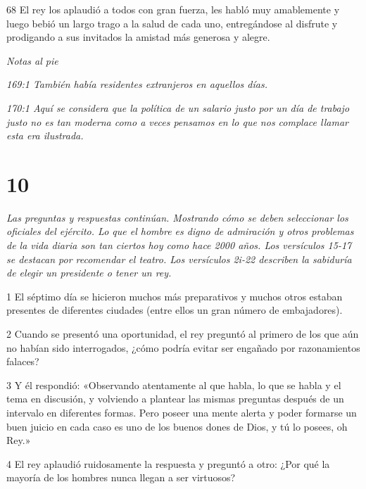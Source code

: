 \par 68 El rey los aplaudió a todos con gran fuerza, les habló muy amablemente y luego bebió un largo trago a la salud de cada uno, entregándose al disfrute y prodigando a sus invitados la amistad más generosa y alegre.

\par \textit{Notas al pie}

\par \textit{169:1 También había residentes extranjeros en aquellos días.}

\par \textit{170:1 Aquí se considera que la política de un salario justo por un día de trabajo justo no es tan moderna como a veces pensamos en lo que nos complace llamar esta era ilustrada.}

\chapter{10}

\par \textit{Las preguntas y respuestas continúan. Mostrando cómo se deben seleccionar los oficiales del ejército. Lo que el hombre es digno de admiración y otros problemas de la vida diaria son tan ciertos hoy como hace 2000 años. Los versículos 15-17 se destacan por recomendar el teatro. Los versículos 2i-22 describen la sabiduría de elegir un presidente o tener un rey.}

\par 1 El séptimo día se hicieron muchos más preparativos y muchos otros estaban presentes de diferentes ciudades (entre ellos un gran número de embajadores).

\par 2 Cuando se presentó una oportunidad, el rey preguntó al primero de los que aún no habían sido interrogados, ¿cómo podría evitar ser engañado por razonamientos falaces?

\par 3 Y él respondió: «Observando atentamente al que habla, lo que se habla y el tema en discusión, y volviendo a plantear las mismas preguntas después de un intervalo en diferentes formas. Pero poseer una mente alerta y poder formarse un buen juicio en cada caso es uno de los buenos dones de Dios, y tú lo posees, oh Rey.»

\par 4 El rey aplaudió ruidosamente la respuesta y preguntó a otro: ¿Por qué la mayoría de los hombres nunca llegan a ser virtuosos?

